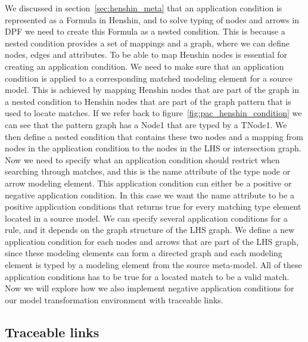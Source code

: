 We discussed in section~\ref{sec:henshin_meta} that an application condition is
represented as a Formula in Henshin, and to solve typing of nodes and arrows in
DPF we need to create this Formula as a nested condition. This is because a
nested condition provides a set of mappings and a graph, where we can define
nodes, edges and attributes. To be able to map Henshin nodes is essential for
creating an application condition. We need to make sure that an application
condition is applied to a corresponding matched modeling element for a source
model. This is achieved by mapping Henshin nodes that are part of the graph in a
nested condition to Henshin nodes that are part of the graph pattern that
is used to locate matches. If we refer back to
figure~\ref{fig:pac_henshin_condition} we can see that the pattern graph has a
Node1 that are typed by a T\textunderscore Node1. We then define a
nested condition that contains these two nodes and a mapping from nodes
in the application condition to the nodes in the LHS or intersection graph. Now
we need to specify what an application condition should restrict when searching
through matches, and this is the name attribute of the type node or arrow
modeling element. This application condition can either be a positive or
negative application condition. In this case we want the name attribute to be a
positive application conditions that returns true for every matching type
element located in a source model. We can specify several application
conditions for a rule, and it depends on the graph structure of the LHS graph.
We define a new application condition for each nodes and arrows that are part of
the LHS graph, since these modeling elements can form a directed graph and each
modeling element is typed by a modeling element from the source meta-model. All
of these application conditions has to be true for a located match to be a
valid match. Now we will explore how we also implement negative application
conditions for our model transformation environment with traceable links.

\subsection{Traceable links}
\label{Trace}

